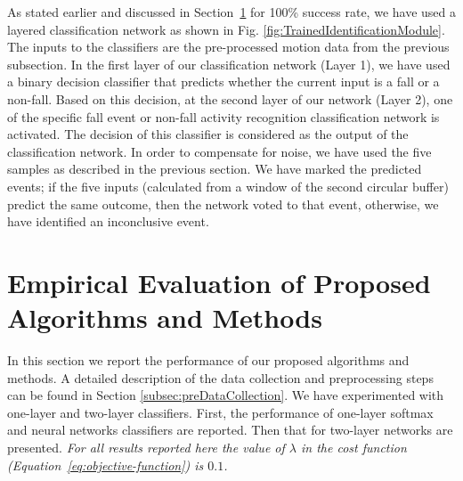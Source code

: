 \documentclass[]{IEEEtran}
\begin{document}
As stated earlier and discussed in Section~\ref{Evaluation} for 100\% success
rate, we have used a layered classification network as shown in Fig.
\ref{fig:TrainedIdentificationModule}. The inputs to the classifiers are the
pre-processed motion data from the previous subsection. In the first layer of
our classification network (Layer 1), we have used a binary decision classifier
that predicts whether the current input is a fall or a non-fall. Based on this
decision, at the second layer of our network (Layer 2), one of the specific
fall event or non-fall activity recognition classification network is
activated. The decision of this classifier is considered as the output of the
classification network. In order to compensate for noise, we have used the five
samples as described in the previous section. We have marked the predicted
events; if the five inputs (calculated from a window of the second circular
buffer) predict the same outcome, then the network voted to that event,
otherwise, we have identified an inconclusive event. 



\section{Empirical Evaluation of Proposed Algorithms and Methods}
\label{Evaluation}

In this section we report the performance of our proposed algorithms and
methods. A detailed description of the data collection and preprocessing steps
can be found in Section \ref{subsec:preDataCollection}.  We have experimented
with one-layer and two-layer classifiers.  First, the performance of one-layer
softmax and neural networks classifiers are reported. Then that for two-layer
networks are presented.  \emph{For all results reported here the value of
$\lambda$ in the cost function (Equation~\ref{eq:objective-function}) is
$0.1$.}
\end{document}
